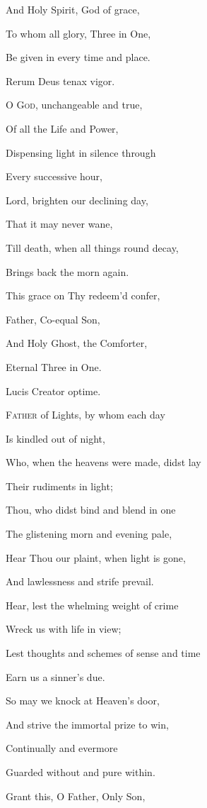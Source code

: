 And Holy Spirit, God of grace,

To whom all glory, Three in One,

Be given in every time and place.


Rerum Deus tenax vigor.

O G\textsc{od}, unchangeable and true,

Of all the Life and Power,

Dispensing light in silence through

Every successive hour,

Lord, brighten our declining day,

That it may never wane,

Till death, when all things round decay,

Brings back the morn again.

This grace on Thy redeem'd confer,

Father, Co-equal Son,

And Holy Ghost, the Comforter,

Eternal Three in One.


Lucis Creator optime.

F\textsc{ather} of Lights, by whom each day

Is kindled out of night,

Who, when the heavens were made, didst lay

Their rudiments in light;

Thou, who didst bind and blend in one

The glistening morn and evening pale,

Hear Thou our plaint, when light is gone,

And lawlessness and strife prevail.

Hear, lest the whelming weight of crime

Wreck us with life in view;

Lest thoughts and schemes of sense and time

Earn us a sinner's due.

So may we knock at Heaven's door,

And strive the immortal prize to win,

Continually and evermore

Guarded without and pure within. 

Grant this, O Father, Only Son,

